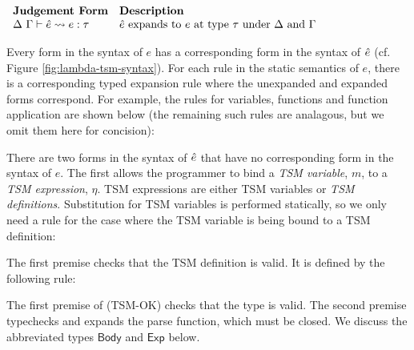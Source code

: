 $\begin{array}{ll}
\textbf{Judgement Form} & \textbf{Description}\\
\Delta~\Gamma \vdash \ue \leadsto e : \tau & \text{$\ue$ expands to $e$ at type $\tau$ under $\Delta$ and $\Gamma$}
\end{array}$

Every form in the syntax of $e$ has a corresponding form in the syntax of $\ue$ (cf. Figure \ref{fig:lambda-tsm-syntax}). For each rule in the static semantics of $e$, there is a corresponding typed expansion rule where the unexpanded and expanded forms correspond. For example, the rules for variables, functions and function application are shown below (the remaining such rules are analagous, but we omit them here for concision):
\begin{mathpar}


\end{mathpar}
There are two forms in the syntax of $\ue$ that have no corresponding form in the syntax of $e$. The first allows the programmer to bind a \emph{TSM variable}, $m$, to a \emph{TSM expression}, $\eta$. TSM expressions are either TSM variables or \emph{TSM definitions}. Substitution for TSM variables is performed statically, so we only need a rule for the case where the TSM variable is being bound to a TSM definition:
\begin{mathpar}
\end{mathpar}
The first premise checks that the TSM definition is valid. It is defined by the following rule:
\begin{mathpar}
\end{mathpar}
The first premise of (TSM-OK) checks that the type is valid. The second premise typechecks and expands the parse function, which must be closed. We discuss the abbreviated types $\mathsf{Body}$ and $\mathsf{Exp}$ below.

